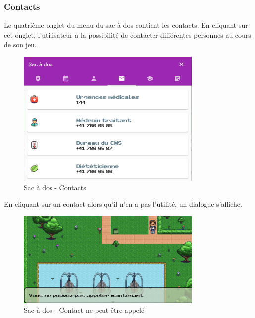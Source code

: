 
\subsubsection*{Contacts}

Le quatrième onglet du menu du sac à dos contient les contacts. En cliquant sur cet onglet, l'utilisateur a la possibilité de contacter différentes personnes au cours de son jeu. \\

\begin{figure}[H]
    \centering
    \includegraphics[width=0.8\textwidth ]{images/toolsMenu/contacts.png}
    \caption{Sac à dos - Contacts}
    \label{fig:pic_dessus}
\end{figure}

En cliquant sur un contact alors qu'il n'en a pas l'utilité, un dialogue s'affiche.
\begin{figure}[H]
    \centering
    \includegraphics[width=0.8\textwidth ]{images/toolsMenu/contactCantBeUsed.png}
    \caption{Sac à dos - Contact ne peut être appelé}
    \label{fig:pic_dessus}
\end{figure}

